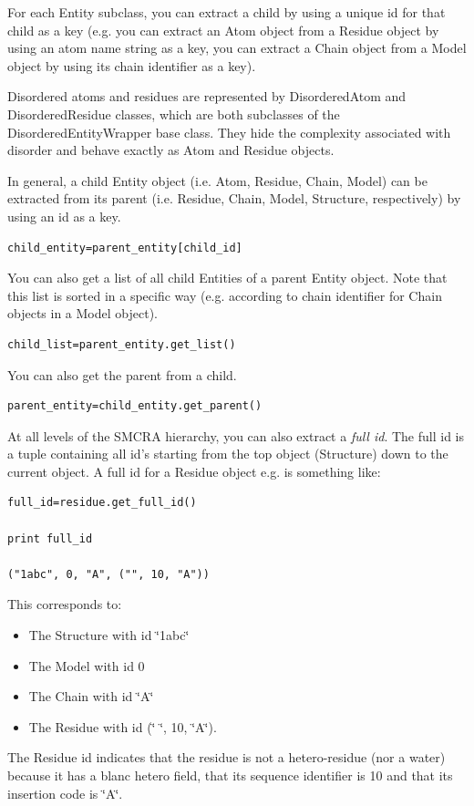 \documentclass{report}
\begin{document}
For each Entity subclass, you can extract a child by using a unique id for that
child as a key (e.g. you can extract an Atom object from a Residue object by
using an atom name string as a key, you can extract a Chain object from a Model
object by using its chain identifier as a key). 

Disordered atoms and residues are represented by DisorderedAtom and DisorderedResidue
classes, which are both subclasses of the DisorderedEntityWrapper base class.
They hide the complexity associated with disorder and behave exactly as Atom
and Residue objects. 

In general, a child Entity object (i.e. Atom, Residue, Chain, Model) can be
extracted from its parent (i.e. Residue, Chain, Model, Structure, respectively)
by using an id as a key.

\begin{verbatim}
child_entity=parent_entity[child_id]
\end{verbatim}

You can also get a list of all child Entities of a parent Entity object. Note
that this list is sorted in a specific way (e.g. according to chain identifier
for Chain objects in a Model object). 

\begin{verbatim}
child_list=parent_entity.get_list()
\end{verbatim}

You can also get the parent from a child.

\begin{verbatim}
parent_entity=child_entity.get_parent()
\end{verbatim}

At all levels of the SMCRA hierarchy, you can also extract a \emph{full id}.
The full id is a tuple containing all id's starting from the top object (Structure)
down to the current object. A full id for a Residue object e.g. is something
like: 

\begin{verbatim}
full_id=residue.get_full_id()

print full_id

("1abc", 0, "A", ("", 10, "A"))
\end{verbatim}

This corresponds to: 

\begin{itemize}
\item The Structure with id \char`\"{}1abc\char`\"{}
\item The Model with id 0 
\item The Chain with id \char`\"{}A\char`\"{}
\item The Residue with id (\char`\"{} \char`\"{}, 10, \char`\"{}A\char`\"{}). 
\end{itemize}
The Residue id indicates that the residue is not a hetero-residue (nor a water)
because it has a blanc hetero field, that its sequence identifier is 10 and
that its insertion code is \char`\"{}A\char`\"{}.
\end{document}
